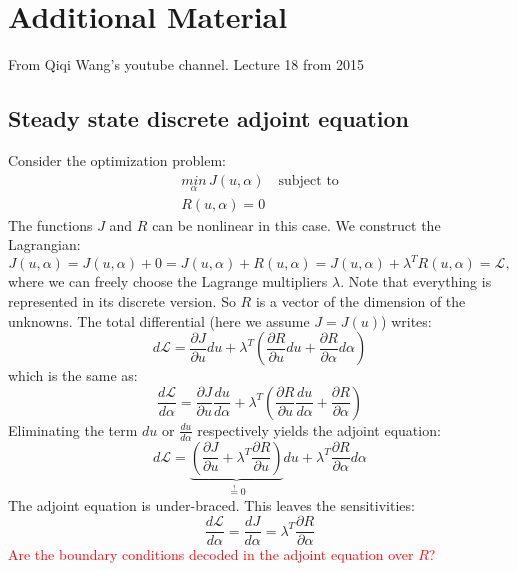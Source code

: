 \documentclass[10pt]{article}
\begin{document}
\section{Additional Material}
From Qiqi Wang's youtube channel. Lecture 18 from 2015
\subsection{Steady state discrete adjoint equation}
Consider the optimization problem:
\begin{eqnarray}
\underset{\alpha}{min}\,J(u,\alpha)\quad \text{subject to}\\
R(u,\alpha)=0
\end{eqnarray}
The functions $J$ and $R$ can be nonlinear in this case. We construct the Lagrangian:
\begin{equation}
J(u,\alpha) = J(u,\alpha) + 0 = J(u,\alpha) + R(u,\alpha) =  J(u,\alpha) + \lambda^T R(u,\alpha) = \mathcal{L},
\end{equation}
where we can freely choose the Lagrange multipliers $\lambda$. Note that everything is represented in its discrete version. So $R$ is a vector of the dimension of the unknowns. The total differential (here we assume $J = J(u)$) writes:
\begin{equation}
d\mathcal{L} = \frac{\partial J}{\partial u} du + \lambda^T \left( \frac{\partial R}{\partial u} du + \frac{\partial R}{\partial \alpha} d\alpha\right)
\end{equation}
which is the same as:
\begin{equation}
\frac{d\mathcal{L}}{d\alpha} = \frac{\partial J}{\partial u} \frac{du}{d\alpha} + \lambda^T \left( \frac{\partial R}{\partial u} \frac{du}{d\alpha} + \frac{\partial R}{\partial \alpha}\right)
\end{equation}
Eliminating the term $du$ or $\frac{du}{d\alpha}$ respectively yields the adjoint equation:
\begin{equation}
d\mathcal{L} = \underbrace{\left(\frac{\partial J}{\partial u} + \lambda^T  \frac{\partial R}{\partial u} \right)}_{\overset{!}{=} 0} du + \lambda^T \frac{\partial R}{\partial \alpha} d\alpha
\end{equation}
The adjoint equation is under-braced. This leaves the sensitivities:
\begin{equation}
\frac{d\mathcal{L}}{d\alpha} = \frac{dJ}{d\alpha} = \lambda^T \frac{\partial R}{\partial \alpha}
\end{equation}
\textcolor{red}{Are the boundary conditions decoded in the adjoint equation over $R$?}
\end{document}
